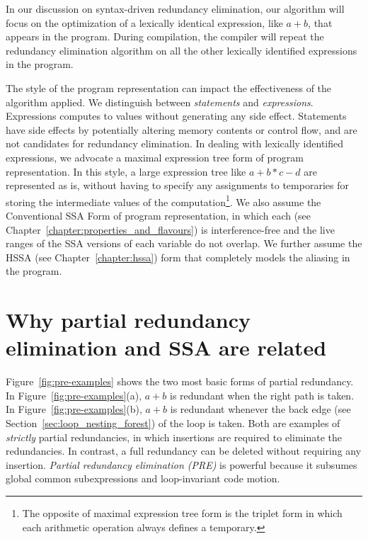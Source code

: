 In our discussion on syntax-driven redundancy elimination, our algorithm will focus on the optimization of a lexically identical expression, like $a+b$, that appears in the program. 
During compilation, the compiler will repeat the redundancy elimination algorithm on all the other lexically identified expressions in the program.

The style of the program representation can impact the effectiveness of the algorithm applied. 
We distinguish between \emph{statements} and \emph{expressions}. 
Expressions computes to values without generating any side effect. 
Statements have side effects by potentially altering memory contents or control flow, and are not candidates for redundancy elimination. 
In dealing with lexically identified expressions, we advocate a maximal expression tree form of program representation. 
In this style, a large expression tree like $a+b*c-d$ are represented as is, without having to specify any assignments to temporaries for storing the intermediate values of the computation\footnote{The opposite of maximal expression tree form is the triplet form in which each arithmetic operation always defines a temporary.}. 
We also assume the Conventional SSA Form of program representation, in which each \phiweb{} (see Chapter~\ref{chapter:properties_and_flavours}) is interference-free and the live ranges of the SSA versions of each variable do not overlap. 
We further assume the HSSA (see Chapter~\ref{chapter:hssa}) form that completely models the aliasing in the program.

\section{Why partial redundancy elimination and SSA are related}
\label{section:Part3:Pre_not_helped:PRErelatedtoSSA}

Figure~\ref{fig:pre-examples} shows the two most basic forms of partial redundancy. 
In Figure~\ref{fig:pre-examples}(a), $a+b$ is redundant when the right path is taken. 
In Figure~\ref{fig:pre-examples}(b), $a+b$ is redundant whenever the back edge (see Section~\ref{sec:loop_nesting_forest}) of the loop is taken. 
Both are examples of \emph{strictly} partial redundancies, in which insertions are required to eliminate the redundancies. 
In contrast, a full redundancy can be deleted without requiring any insertion. 
\emph{Partial redundancy elimination (PRE)} is powerful because it subsumes global common subexpressions and loop-invariant code motion.

